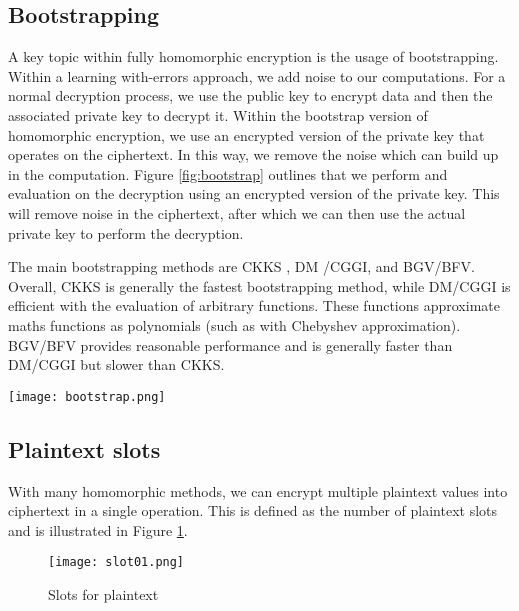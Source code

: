 \documentclass[envcountsame,runningheads,notitlepage]{llncs}
\begin{document}

\subsection{Bootstrapping}
A key topic within fully homomorphic encryption is the usage of bootstrapping. Within a learning with-errors approach, we add noise to our computations. For a normal decryption process, we use the public key to encrypt data and then the associated private key to decrypt it. Within the bootstrap version of homomorphic encryption, we use an encrypted version of the private key that operates on the ciphertext. In this way, we remove the noise which can build up in the computation. Figure \ref{fig:bootstrap} outlines that we perform and evaluation on the decryption using an encrypted version of the private key. This will remove noise in the ciphertext, after which we can then use the actual private key to perform the decryption.

The main bootstrapping methods are CKKS \cite{cheon2017homomorphic}, DM \cite{ducas2015fhew}/CGGI, and BGV/BFV. Overall, CKKS is generally the fastest bootstrapping method, while DM/CGGI is efficient with the evaluation of arbitrary functions. These functions approximate maths functions as polynomials (such as with  Chebyshev approximation). BGV/BFV provides reasonable performance and is generally faster than DM/CGGI but slower than CKKS.

\begin{figure*}
\begin{center}
  \texttt{[image: bootstrap.png]}
  \caption{Bootstrap}
  \label{fig:bootstrap}
  \end{center}
\end{figure*}


\subsection{Plaintext slots}
With many homomorphic methods, we can encrypt multiple plaintext values into ciphertext in a single operation. This is defined as the number of plaintext slots and is illustrated in Figure \ref{fig:slots}.

\begin{figure}
\centering
  \texttt{[image: slot01.png]}
  \caption{Slots for plaintext}
  \label{fig:slots}
\end{figure}
\end{document}

